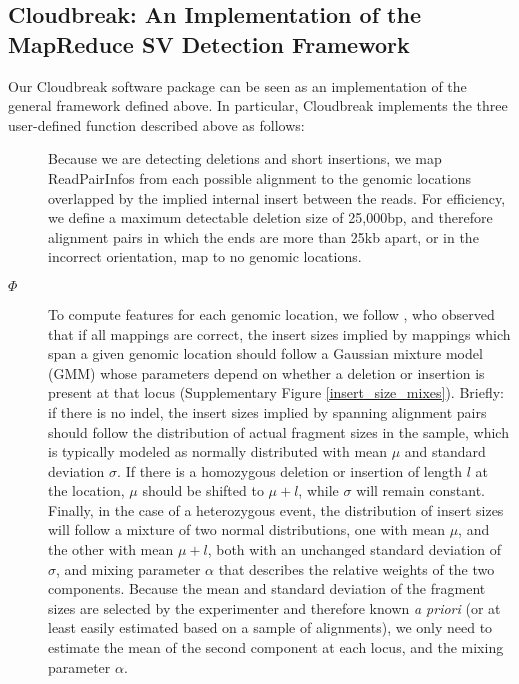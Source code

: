 \documentclass[11pt]{article}
\begin{document}
\subsection{Cloudbreak: An Implementation of the MapReduce SV Detection Framework}

Our Cloudbreak software package can be seen as an implementation of the general framework defined above. In particular, Cloudbreak implements the three user-defined function described above as follows:

\begin{description}
\item[] Because we are detecting deletions and short insertions, we map ReadPairInfos from each possible alignment to the genomic locations overlapped by the implied internal insert between the reads. For efficiency, we define a maximum detectable deletion size of 25,000bp, and therefore alignment pairs in which the ends are more than 25kb apart, or in the incorrect orientation, map to no genomic locations.
\item[$\Phi$] To compute features for each genomic location, we follow \textcite{Lee:2009da}, who observed that if all mappings are correct, the insert sizes implied by mappings which span a given genomic location should follow a Gaussian mixture model (GMM) whose parameters depend on whether a deletion or insertion is present at that locus (Supplementary Figure \ref{insert_size_mixes}). Briefly: if there is no indel, the insert sizes implied by spanning alignment pairs should follow the distribution of actual fragment sizes in the sample, which is typically modeled as normally distributed with mean $\mu$ and standard deviation $\sigma$. If there is a homozygous deletion or insertion of length $l$ at the location, $\mu$ should be shifted to $\mu + l$, while $\sigma$ will remain constant. Finally, in the case of a heterozygous event, the distribution of insert sizes will follow a mixture of two normal distributions, one with mean $\mu$, and the other with mean $\mu + l$, both with an unchanged standard deviation of $\sigma$, and mixing parameter $\alpha$ that describes the relative weights of the two components. Because the mean and standard deviation of the fragment sizes are selected by the experimenter and therefore known \emph{a priori} (or at least easily estimated based on a sample of alignments), we only need to estimate the mean of the second component at each locus, and the mixing parameter $\alpha$.


\end{description}
\end{document}
